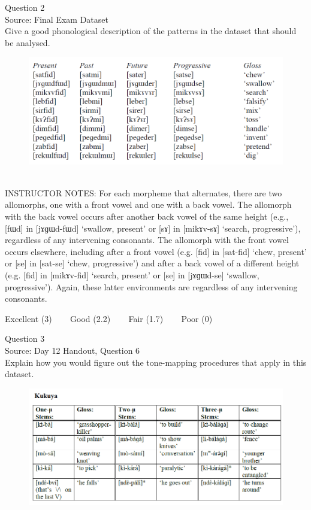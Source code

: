 \documentclass[12pt]{article}
\begin{document}
{\large Question 2}\\

Source: Final Exam Dataset\\

Give a good phonological description of the patterns in the dataset that should be analysed.\\

\begin{figure}[H]
\includegraphics{../images/final_dataset.png}
\end{figure}

~\\
INSTRUCTOR NOTES: For each morpheme that alternates, there are two allomorphs, one with a front vowel and one with a back vowel. The allomorph with the back vowel occurs after another back vowel of the same height (e.g., [fɯd] in [jɤɡɯd-fɯd] ‘swallow, present’ or [sɤ] in [mikɤv-sɤ] ‘search, progressive’), regardless of any intervening consonants. The allomorph with the front vowel occurs elsewhere, including after a front vowel (e.g. [fid] in [sat-fid] ‘chew, present’ or [se] in [sat-se] ‘chew, progressive’) and after a back vowel of a different height (e.g. [fid] in [mikɤv-fid] ‘search, present’ or [se] in [jɤɡɯd-se] ‘swallow, progressive’). Again, these latter environments are regardless of any intervening consonants.


\vfill
Excellent (3) ~~~ Good (2.2) ~~~ Fair (1.7) ~~~ Poor (0)
\newpage

{\large Question 3}\\

Source: Day 12 Handout, Question 6\\

Explain how you would figure out the tone-mapping procedures that apply in this dataset.\\

\begin{figure}[H]
\includegraphics{../images/kukuya.png}
\end{figure}
\end{document}
